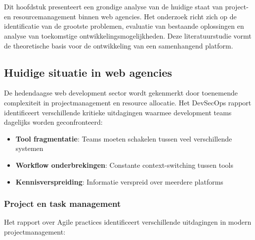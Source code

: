 \chapter{}
\label{ch:stand-van-zaken}

Dit hoofdstuk presenteert een grondige analyse van de huidige staat van project- en resourcemanagement binnen web agencies. Het onderzoek richt zich op de identificatie van de grootste problemen, evaluatie van bestaande oplossingen en analyse van toekomstige ontwikkelingsmogelijkheden. Deze literatuurstudie vormt de theoretische basis voor de ontwikkeling van een samenhangend platform.

\section{Huidige situatie in web agencies}
\label{sec:huidige-situatie}

De hedendaagse web development sector wordt gekenmerkt door toenemende complexiteit in projectmanagement en resource allocatie. Het \textcite{GitLab2023} DevSecOps rapport identificeert verschillende kritieke uitdagingen waarmee development teams dagelijks worden geconfronteerd:

\begin{itemize}
    \item \textbf{Tool fragmentatie}: Teams moeten schakelen tussen veel verschillende systemen
    \item \textbf{Workflow onderbrekingen}: Constante context-switching tussen tools
    \item \textbf{Kennisverspreiding}: Informatie verspreid over meerdere platforms
\end{itemize}

\subsection{Project en task management}
\label{subsec:project-management}

Het \textcite{Atlassian2023} rapport over Agile practices identificeert verschillende uitdagingen in modern projectmanagement:

